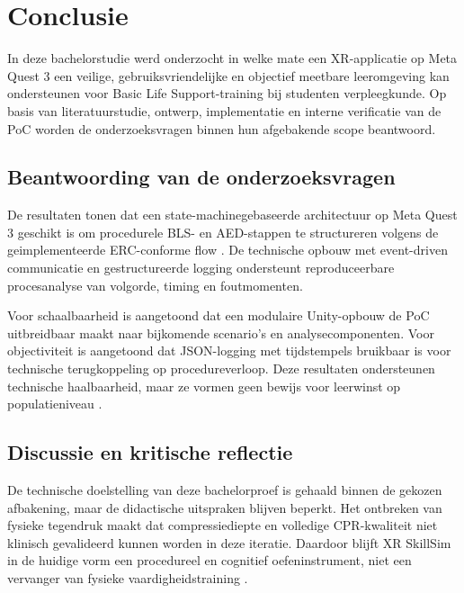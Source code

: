 
\chapter{Conclusie}%
\label{ch:conclusie}

In deze bachelorstudie werd onderzocht in welke mate een XR-applicatie op Meta Quest 3 een veilige, gebruiksvriendelijke en objectief meetbare leeromgeving kan ondersteunen voor Basic Life Support-training bij studenten verpleegkunde. Op basis van literatuurstudie, ontwerp, implementatie en interne verificatie van de PoC worden de onderzoeksvragen binnen hun afgebakende scope beantwoord.

\section{Beantwoording van de onderzoeksvragen}
De resultaten tonen dat een state-machinegebaseerde architectuur op Meta Quest 3 geschikt is om procedurele BLS- en AED-stappen te structureren volgens de geimplementeerde ERC-conforme flow \cite{ERC2025BLS, Pottle2019}. De technische opbouw met event-driven communicatie en gestructureerde logging ondersteunt reproduceerbare procesanalyse van volgorde, timing en foutmomenten.

Voor schaalbaarheid is aangetoond dat een modulaire Unity-opbouw de PoC uitbreidbaar maakt naar bijkomende scenario's en analysecomponenten. Voor objectiviteit is aangetoond dat JSON-logging met tijdstempels bruikbaar is voor technische terugkoppeling op procedureverloop. Deze resultaten ondersteunen technische haalbaarheid, maar ze vormen geen bewijs voor leerwinst op populatieniveau \cite{Radianti2020VRHE}.

\section{Discussie en kritische reflectie}
De technische doelstelling van deze bachelorproef is gehaald binnen de gekozen afbakening, maar de didactische uitspraken blijven beperkt. Het ontbreken van fysieke tegendruk maakt dat compressiediepte en volledige CPR-kwaliteit niet klinisch gevalideerd kunnen worden in deze iteratie. Daardoor blijft XR SkillSim in de huidige vorm een procedureel en cognitief oefeninstrument, niet een vervanger van fysieke vaardigheidstraining \cite{Alaker2016VR, ILCOR2023Immersive}.

